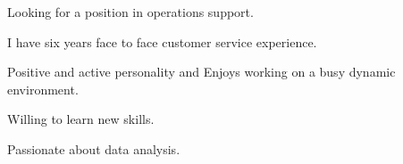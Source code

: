 

\begin{cventries}

  \cventry
    {} %
    {} %
    {} %
    {} %
    {
      \begin{cvitems} %
      \item Looking for a position in operations support.
      \item I have six years face to face customer service experience.
      \item Positive and active personality and Enjoys working on a busy dynamic environment.
      \item Willing to learn new skills.
      \item Passionate about data analysis. 
      \end{cvitems}
    }


\end{cventries}
